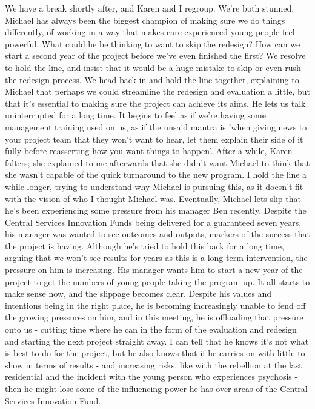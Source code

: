 We have a break shortly after, and Karen and I regroup. We're both stunned. Michael has always been the biggest champion of making sure we do things differently, of working in a way that makes care-experienced young people feel powerful. What could he be thinking to want to skip the redesign? How can we start a second year of the project before we've even finished the first? We resolve to hold the line, and insist that it would be a huge mistake to skip or even rush the redesign process. We head back in and hold the line together, explaining to Michael that perhaps we could streamline the redesign and evaluation a little, but that it's essential to making sure the project can achieve its aims. He lets us talk uninterrupted for a long time. It begins to feel as if we're having some management training used on us, as if the unsaid mantra is 'when giving news to your project team that they won't want to hear, let them explain their side of it fully before reasserting how you want things to happen'. After a while, Karen falters; she explained to me afterwards that she didn't want Michael to think that she wasn't capable of the quick turnaround to the new program. I hold the line a while longer, trying to understand why Michael is pursuing this, as it doesn't fit with the vision of who I thought Michael was. 
Eventually, Michael lets slip that he's been experiencing some pressure from his manager Ben recently. Despite the Central Services Innovation Funds being delivered for a guaranteed seven years, his manager was wanted to see outcomes and outputs, markers of the success that the project is having. Although he's tried to hold this back for a long time, arguing that we won't see results for years as this is a long-term intervention, the pressure on him is increasing. His manager wants him to start a new year of the project to get the numbers of young people taking the program up. It all starts to make sense now, and the slippage becomes clear. Despite his values and intentions being in the right place, he is becoming increasingly unable to fend off the growing pressures on him, and in this meeting, he is offloading that pressure onto us - cutting time where he can in the form of the evaluation and redesign and starting the next project straight away. I can tell that he knows it's not what is best to do for the project, but he also knows that if he carries on  with little to show in terms of results - and increasing risks, like with the rebellion at the last residential and the incident with the young person who experiences psychosis - then he might lose some of the influencing power he has over areas of the Central Services Innovation Fund.

